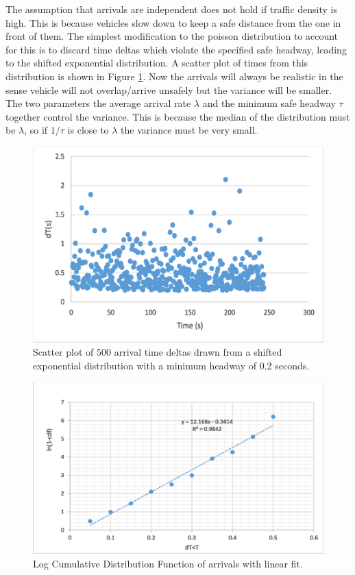\documentclass[]{article}
\begin{document}
The assumption that arrivals are independent does not hold if traffic density is high. This is because vehicles slow down to keep a safe distance from the one in front of them. The simplest modification to the poisson distribution to account for this is to discard time deltas which violate the specified safe headway, leading to the shifted exponential distribution. A scatter plot of times from this distribution is shown in Figure \ref{fig:poisson_shifted_scatter}. Now the arrivals will always be realistic in the sense vehicle will not overlap/arrive unsafely but the variance will be smaller. The two parameters the average arrival rate $\lambda$ and the minimum safe headway $\tau$ together control the variance. This is because the median of the distribution must be $\lambda$, so if $1/\tau$ is close to $\lambda$ the variance must be very small.   

\begin{figure}
	\centering
	\includegraphics[width=0.9\linewidth]{poisson_shifted_scatter.eps}
	\caption{Scatter plot of 500 arrival time deltas drawn from a shifted exponential distribution with a minimum headway of 0.2 seconds.}
	\label{fig:poisson_shifted_scatter}
\end{figure}
\begin{figure}
	\centering
	\includegraphics[width=0.9\linewidth]{ln(1-cdf)poisson_arr.eps}
	\caption{Log Cumulative Distribution Function of arrivals with linear fit.}
	\label{fig:1_minus_ln_cdf_arr}
\end{figure}
\end{document}

